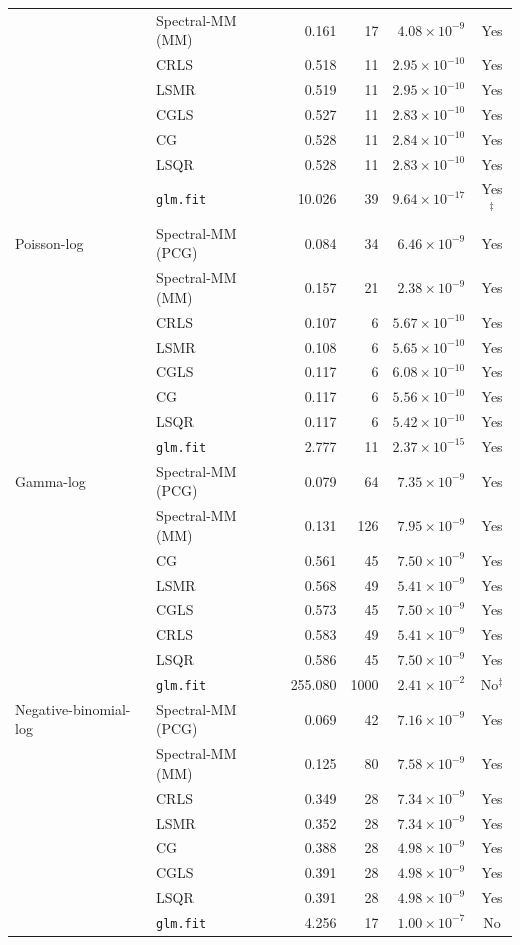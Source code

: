 \begin{longtable}{llrrrc}
 & Spectral-MM (MM) & 0.161 & 17 & $4.08\times10^{-9}$ & Yes \\
 & CRLS & 0.518 & 11 & $2.95\times10^{-10}$ & Yes \\
 & LSMR & 0.519 & 11 & $2.95\times10^{-10}$ & Yes \\
 & CGLS & 0.527 & 11 & $2.83\times10^{-10}$ & Yes \\
 & CG & 0.528 & 11 & $2.84\times10^{-10}$ & Yes \\
 & LSQR & 0.528 & 11 & $2.83\times10^{-10}$ & Yes \\
 & \texttt{glm.fit} & 10.026 & 39 & $9.64\times10^{-17}$ & Yes$^{\ddagger}$ \\
\midrule
Poisson-log & Spectral-MM (PCG) & 0.084 & 34 & $6.46\times10^{-9}$ & Yes \\
 & Spectral-MM (MM) & 0.157 & 21 & $2.38\times10^{-9}$ & Yes \\
 & CRLS & 0.107 & 6 & $5.67\times10^{-10}$ & Yes \\
 & LSMR & 0.108 & 6 & $5.65\times10^{-10}$ & Yes \\
 & CGLS & 0.117 & 6 & $6.08\times10^{-10}$ & Yes \\
 & CG & 0.117 & 6 & $5.56\times10^{-10}$ & Yes \\
 & LSQR & 0.117 & 6 & $5.42\times10^{-10}$ & Yes \\
 & \texttt{glm.fit} & 2.777 & 11 & $2.37\times10^{-15}$ & Yes \\
\midrule
Gamma-log & Spectral-MM (PCG) & 0.079 & 64 & $7.35\times10^{-9}$ & Yes \\
 & Spectral-MM (MM) & 0.131 & 126 & $7.95\times10^{-9}$ & Yes \\
 & CG & 0.561 & 45 & $7.50\times10^{-9}$ & Yes \\
 & LSMR & 0.568 & 49 & $5.41\times10^{-9}$ & Yes \\
 & CGLS & 0.573 & 45 & $7.50\times10^{-9}$ & Yes \\
 & CRLS & 0.583 & 49 & $5.41\times10^{-9}$ & Yes \\
 & LSQR & 0.586 & 45 & $7.50\times10^{-9}$ & Yes \\
 & \texttt{glm.fit} & 255.080 & 1000 & $2.41\times10^{-2}$ & No$^{\ddagger}$ \\
\midrule
Negative-binomial-log & Spectral-MM (PCG) & 0.069 & 42 & $7.16\times10^{-9}$ & Yes \\
 & Spectral-MM (MM) & 0.125 & 80 & $7.58\times10^{-9}$ & Yes \\
 & CRLS & 0.349 & 28 & $7.34\times10^{-9}$ & Yes \\
 & LSMR & 0.352 & 28 & $7.34\times10^{-9}$ & Yes \\
 & CG & 0.388 & 28 & $4.98\times10^{-9}$ & Yes \\
 & CGLS & 0.391 & 28 & $4.98\times10^{-9}$ & Yes \\
 & LSQR & 0.391 & 28 & $4.98\times10^{-9}$ & Yes \\
 & \texttt{glm.fit} & 4.256 & 17 & $1.00\times10^{-7}$ & No \\
\end{longtable}
